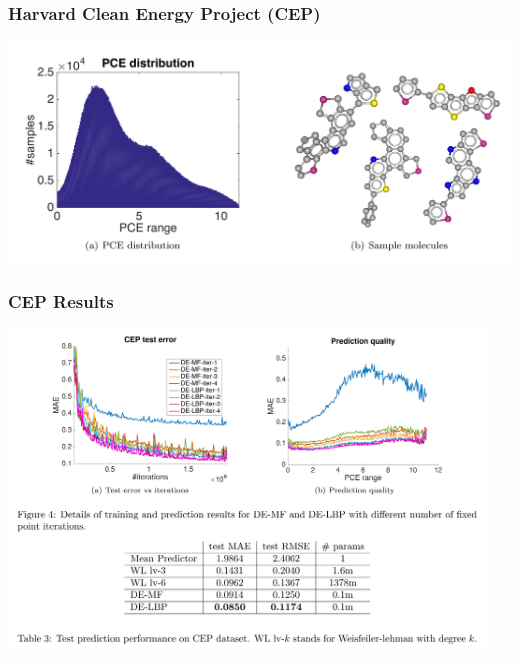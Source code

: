 \documentclass{beamer}
\begin{document}
    \begin{frame}
        \frametitle{Harvard Clean Energy Project (CEP)}
        \begin{center}
            \includegraphics[width=\textwidth]{cep_data.png}
        \end{center}
    \end{frame}

    \begin{frame}
        \frametitle{CEP Results}
        \begin{center}
            \includegraphics[width=0.95\textwidth]{cep_results.png}
        \end{center}
    \end{frame}
\end{document}
